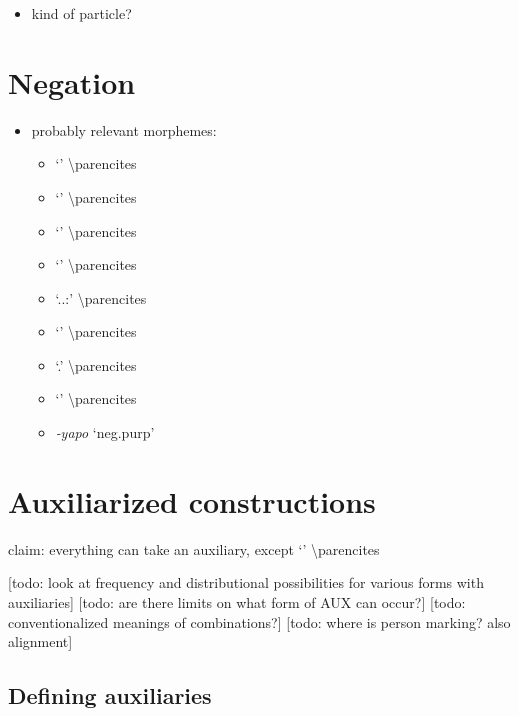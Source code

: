 \documentclass{memoir}
\begin{document}
\begin{itemize}
\tightlist
\item
  kind of particle?
\end{itemize}

\chapter{\texorpdfstring{Negation \label{negation}}{Negation }}

\begin{itemize}
\tightlist
\item
  probably relevant morphemes:

  \begin{itemize}
  \tightlist
  \item
     `' \textbackslash parencites
  \item
     `' \textbackslash parencites
  \item
     `' \textbackslash parencites
  \item
     `' \textbackslash parencites
  \item
     `..:'
    \textbackslash parencites
  \item
     `' \textbackslash parencites
  \item
     `.' \textbackslash parencites
  \item
     `' \textbackslash parencites
  \item
    \emph{‑yapo} `neg.purp'
  \end{itemize}
\end{itemize}

\chapter{Auxiliarized constructions}

claim: everything can take an auxiliary, except  `'
\textbackslash parencites

{[}todo: look at frequency and distributional possibilities for various
forms with auxiliaries{]} {[}todo: are there limits on what form of AUX
can occur?{]} {[}todo: conventionalized meanings of combinations?{]}
{[}todo: where is person marking? also alignment{]}

\section{Defining auxiliaries}
\end{document}
